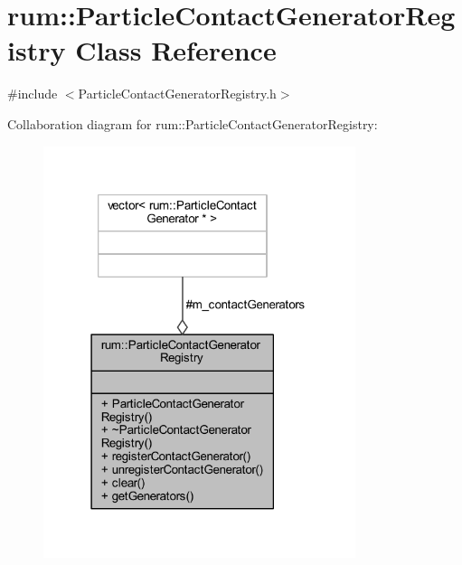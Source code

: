 \hypertarget{classrum_1_1_particle_contact_generator_registry}{}\section{rum\+:\+:Particle\+Contact\+Generator\+Registry Class Reference}
\label{classrum_1_1_particle_contact_generator_registry}


{\ttfamily \#include $<$Particle\+Contact\+Generator\+Registry.\+h$>$}



Collaboration diagram for rum\+:\+:Particle\+Contact\+Generator\+Registry\+:\nopagebreak
\begin{figure}[H]
\begin{center}
\leavevmode
\includegraphics[width=259pt]{classrum_1_1_particle_contact_generator_registry__coll__graph}
\end{center}
\end{figure}
